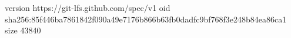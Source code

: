 version https://git-lfs.github.com/spec/v1
oid sha256:85f446ba7861842f090a49e7176b866b63fb0dadfc9bf768f3e248b84ea86ca1
size 43840
